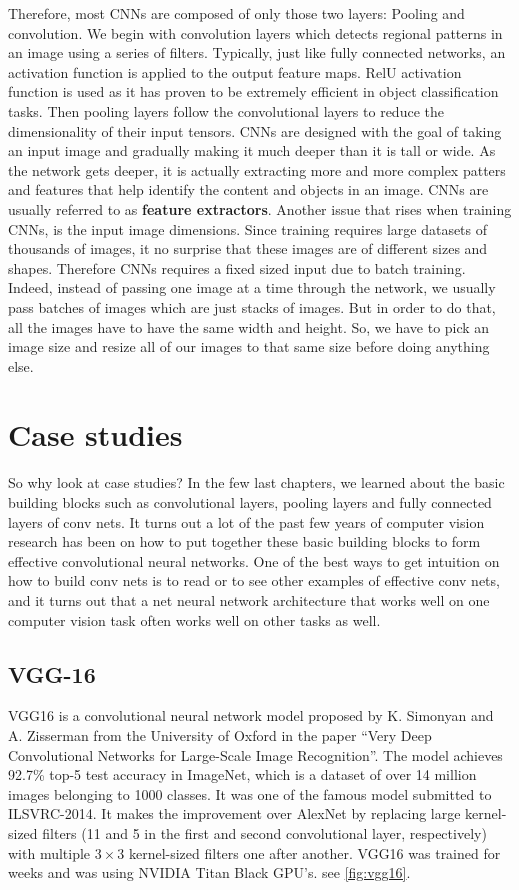 Therefore, most CNNs are composed of only those two layers: Pooling and convolution. We begin with convolution layers which detects regional patterns
in an image using a series of filters. Typically, just like fully connected networks, an activation function is applied to the output feature maps.
RelU activation function is used as it has proven to be extremely efficient in object classification tasks. Then pooling layers follow the
convolutional layers to reduce the dimensionality of their input tensors. CNNs are designed with the goal of taking an input image and gradually
making it much deeper than it is tall or wide. As the network gets deeper, it is actually extracting more and more complex patters and features that
help identify the content and objects in an image. CNNs are usually referred to as \textbf{feature extractors}. Another issue that rises when
training CNNs, is the input image dimensions. Since training requires large datasets of thousands of images, it no surprise that these images
are of different sizes and shapes. Therefore CNNs requires a fixed sized input due to batch training. Indeed, instead of passing one image at a time
through the network, we usually pass batches of images which are just stacks of images. But in order to do that, all the images have to have the
same width and height. So, we have to pick an image size and resize all of our images to that same size before doing anything else.

\section{Case studies}

So why look at case studies? In the few last chapters, we learned about the basic building blocks such as convolutional layers, pooling layers and fully connected layers of conv nets. It turns out a lot of the past few years of computer vision research has been on how to put together these basic building blocks to form effective convolutional neural networks. One of the best ways to get intuition on how to build conv nets is to read or to see other examples of effective conv nets, and it turns out that a net neural network architecture that works well on one computer vision task often works well on other tasks as well.

\subsection{VGG-16}

VGG16 is a convolutional neural network model proposed by K. Simonyan and A. Zisserman from the University of Oxford in the paper “Very Deep Convolutional Networks for Large-Scale Image Recognition”. The model achieves 92.7\% top-5 test accuracy in ImageNet, which is a dataset of over 14 million images belonging to 1000 classes. It was one of the famous model submitted to ILSVRC-2014. It makes the improvement over AlexNet by replacing large kernel-sized filters (11 and 5 in the first and second convolutional layer, respectively) with multiple $3 \times 3$ kernel-sized filters one after another. VGG16 was trained for weeks and was using NVIDIA Titan Black GPU’s. see \cref{fig:vgg16}.

